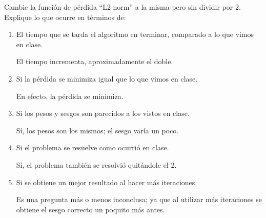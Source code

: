 \begin{problema}
	Cambie la función de pérdida “L2-norm” a la misma pero sin dividir por 2.  Explique lo que ocurre en términos de:
	\begin{enumerate}
		\item El tiempo que se tarda el algoritmo en terminar, comparado a lo que vimos en clase.
		\begin{sol}
			El tiempo incrementa, aproximadamente el doble.
		\end{sol}
		\item Si la pérdida se minimiza igual que lo que vimos en clase.
		\begin{sol}
			En efecto, la pérdida se minimiza. 
		\end{sol}
		\item Si los pesos y sesgos son parecidos a los vistos en clase.
		\begin{sol}
			Sí, los pesos son los mismos; el sesgo varía un poco. 
		\end{sol}
		\item Si el problema se resuelve como ocurrió en clase.
		\begin{sol}
			Sí, el problema también se resolvió quitándole el 2. 
		\end{sol}
		\item Si se obtiene un mejor resultado al hacer más iteraciones.
		\begin{sol}
			Es una pregunta más o menos inconclusa; ya que al utilizar más iteraciones se obtiene el sesgo correcto un poquito más antes. 
		\end{sol}
	\end{enumerate}
\end{problema}

